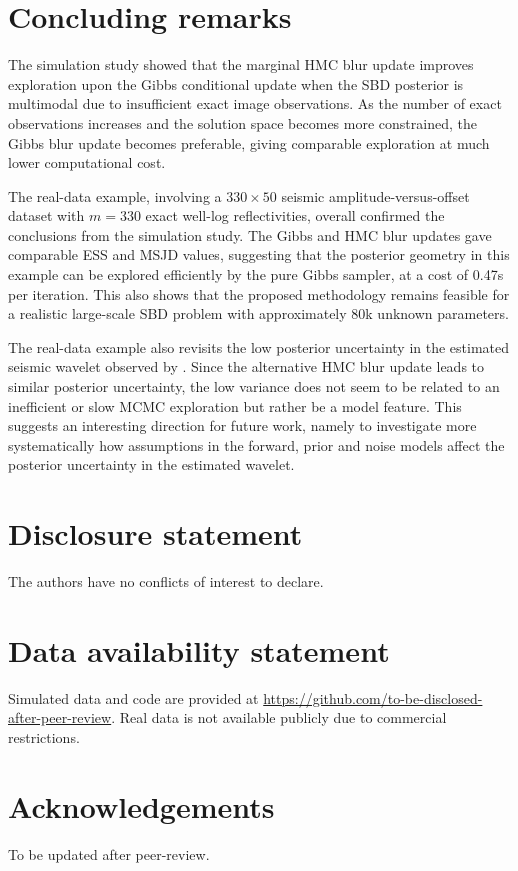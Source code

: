 \documentclass[12pt]{article}
\begin{document}
\section{Concluding remarks}\label{sec:conclusion}

The simulation study showed that the marginal HMC blur update improves exploration upon the Gibbs conditional update when the SBD posterior is multimodal due to insufficient exact image observations. As the number of exact observations increases and the solution space becomes more constrained, the Gibbs blur update becomes preferable, giving comparable exploration at much lower computational cost.

The real-data example, involving a $330 \times 50$ seismic amplitude-versus-offset dataset with $m=330$ exact well-log reflectivities, overall confirmed the conclusions from the simulation study. The Gibbs and HMC blur updates gave comparable ESS and MSJD values, suggesting that the posterior geometry in this example can be explored efficiently by the pure Gibbs sampler, at a cost of 0.47s per iteration. This also shows that the proposed methodology remains feasible for a realistic large-scale SBD problem with approximately 80k unknown parameters.

The real-data example also revisits the low posterior uncertainty in the estimated seismic wavelet observed by \citet{Senn2025}. Since the alternative HMC blur update leads to similar posterior uncertainty, the low variance does not seem to be related to an inefficient or slow MCMC exploration but rather be a model feature. This suggests an interesting direction for future work, namely to investigate more systematically how assumptions in the forward, prior and noise models affect the posterior uncertainty in the estimated wavelet.

{

}

\section{Disclosure statement}\label{disclosure-statement}
The authors have no conflicts of interest to declare.

\section{Data availability statement}
Simulated data and code are provided at \url{https://github.com/to-be-disclosed-after-peer-review}. Real data is not available publicly due to commercial restrictions.

\section*{Acknowledgements}
To be updated after peer-review.

\label{supplementary-material}
\bigskip
\end{document}
